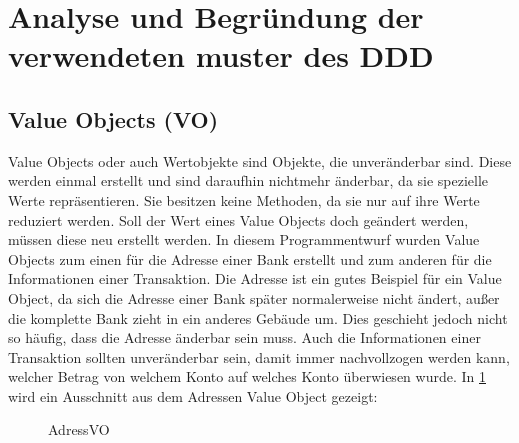 \section{Analyse und Begründung der verwendeten muster des DDD}
\subsection{Value Objects (VO)}
Value Objects oder auch Wertobjekte sind Objekte, die unveränderbar sind. Diese werden einmal erstellt und sind daraufhin nichtmehr änderbar, da sie spezielle Werte repräsentieren. Sie besitzen keine Methoden, da sie nur auf ihre Werte reduziert werden.
Soll der Wert eines Value Objects doch geändert werden, müssen diese neu erstellt werden. In diesem Programmentwurf wurden Value Objects zum einen für die Adresse einer Bank erstellt und zum anderen für die Informationen einer Transaktion. 
Die Adresse ist ein gutes Beispiel für ein Value Object, da sich die Adresse einer Bank später normalerweise nicht ändert, außer die komplette Bank zieht in ein anderes Gebäude um. Dies geschieht jedoch nicht so häufig, dass die 
Adresse änderbar sein muss. Auch die Informationen einer Transaktion sollten unveränderbar sein, damit immer nachvollzogen werden kann, welcher Betrag von welchem Konto auf welches Konto überwiesen wurde. 
\newline In \ref{valueObject} wird ein Ausschnitt aus dem Adressen Value Object gezeigt:
\begin{figure}[htbp]
    \centering
    \caption{\label{valueObject} AdressVO}
\end{figure}
